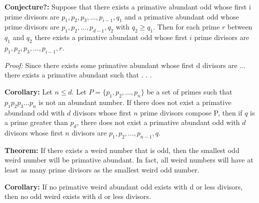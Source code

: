 \documentclass[../paper.tex]{subfiles}
\begin{document}






\textbf{Conjecture?:} Suppose that there exists a primative abundant
odd whose first i prime divisors are $p_1, p_2, p_3, ..., p_{i-1}, 
q_1$ and a primative abundant odd whose prime divisors are $p_1, p_2, 
..., p_{d-1}, q_2$ with $q_2 \geq q_1$. Then for each prime $r$ 
between $q_1$ and $q_2$ there exists a primative abundant odd whose 
first $i$ prime divisors are $p_1, p_2, p_3, ..., p_{i-1}, r$.

\textit{Proof:} 
%
Since there exists some primative abundant whose first d divisors
are ... there exists a primative abundant such that 
.
.
.


\textbf{Corollary:} 
Let $n \leq d$. Let $P = \{p_1, p_2, ..., p_n\}$ be a set of primes
such that $p_1 p_2 p_3 ... p_n$ is not an abundant number.
If there does not exist a primative abundand odd with $d$ divisors
whose first $n$ prime divisors compose P, then if $q$ is a prime 
greater than $p_d$, there does not exist a primative abundant odd
with $d$ divisors whose first $n$ divisors are $p_1, p_2, ...,
p_{n-1}, q$.

\textbf{Theorem:} If there exists a weird number that is odd, 
then the smallest odd weird number will be primative abundant.
In fact, all weird numbers will have at least as many prime
divisors as the smallest weird odd number.

\textbf{Corollary:} If no primative weird abundant odd exists
with d or less divisors, then no odd weird exists with d or less
divisors.
\end{document}
